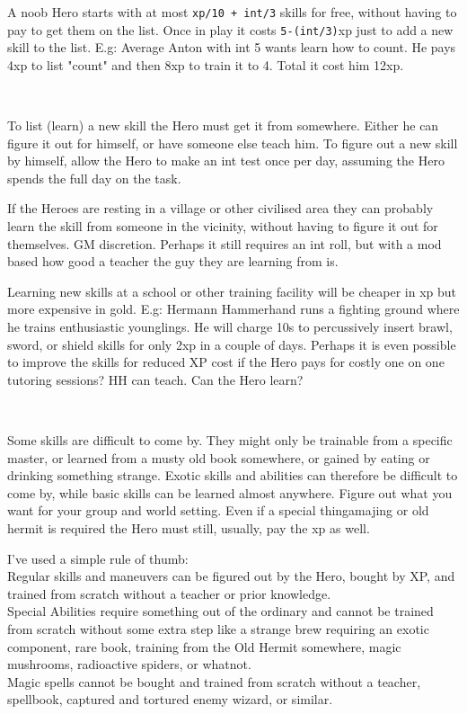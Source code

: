 A noob Hero starts with at most \verb|xp/10 + int/3| skills for free, without having to pay to get them on the list.
Once in play it costs \verb|5-(int/3)|xp just to add a new skill to the list.
E.g: Average Anton with int 5 wants learn how to count. He pays 4xp to list "count" and then 8xp to train it to 4. Total it cost him 12xp.

\

To list (learn) a new skill the Hero must get it from somewhere. Either he can figure it out for himself, or have someone else teach him.
To figure out a new skill by himself, allow the Hero to make an int test once per day, assuming the Hero spends the full day on the task.

If the Heroes are resting in a village or other civilised area they can probably learn the skill from someone in the vicinity, without having to figure it out for themselves. GM discretion. Perhaps it still requires an int roll, but with a mod based how good a teacher the guy they are learning from is.

Learning new skills at a school or other training facility will be cheaper in xp but more expensive in gold. E.g: Hermann Hammerhand runs a fighting ground where he trains enthusiastic younglings. He will charge 10s to percussively insert brawl, sword, or shield skills for only 2xp in a couple of days. Perhaps it is even possible to improve the skills for reduced XP cost if the Hero pays for costly one on one tutoring sessions? HH can teach. Can the Hero learn?

\

Some skills are difficult to come by. They might only be trainable from a specific master, or learned from a musty old book somewhere, or gained by eating or drinking something strange. Exotic skills and abilities can therefore be difficult to come by, while basic skills can be learned almost anywhere. Figure out what you want for your group and world setting.
Even if a special thingamajing or old hermit is required the Hero must still, usually, pay the xp as well.

I've used a simple rule of thumb: \\
Regular skills and maneuvers can be figured out by the Hero, bought by XP, and trained from scratch without a teacher or prior knowledge. \\
Special Abilities require something out of the ordinary and cannot be trained from scratch without some extra step like a strange brew requiring an exotic component, rare book, training from the Old Hermit somewhere, magic mushrooms, radioactive spiders, or whatnot.\\
Magic spells cannot be bought and trained from scratch without a teacher, spellbook, captured and tortured enemy wizard, or similar.

